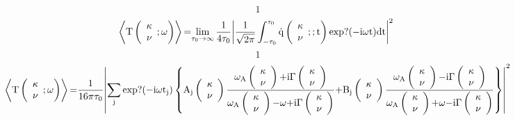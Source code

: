 \documentclass{article}
\begin{document}
\[1\] 
\[\left\langle {\rm T}\left( \begin{array}{c}
{\mathbf \kappa } \\ 
\nu  \end{array}
;\omega \right)\right\rangle {\rm =}{\mathop{\lim }_{{\tau }_0\to \infty } \frac{{\rm 1}}{{\rm 4}{\tau }_0}{\left|\frac{{\rm 1}}{\sqrt{{\rm 2}\pi }}\int^{{\tau }_0}_{{\rm -}{\tau }_0}{\dot{{\rm q}}\left( \begin{array}{c}
{\mathbf \kappa } \\ 
\nu  \end{array}
;;{\rm t}\right){\rm exp}?{\rm (-i}\omega {\rm t)dt}}\right|}^{{\rm 2}}\ }\] 
\[1\] 
\[\left\langle {\rm T}\left( \begin{array}{c}
{\mathbf \kappa } \\ 
\nu  \end{array}
;\omega \right)\right\rangle {\rm =}\frac{{\rm 1}}{{\rm 16}\pi {\tau }_0}{\left|\sum_{{\rm j}}{{\rm exp}?{\rm (-i}\omega {{\rm t}}_{{\rm j}}{\rm )}\left\{{{\rm A}}_{{\rm j}}\left( \begin{array}{c}
{\mathbf \kappa } \\ 
\nu  \end{array}
\right)\frac{{\omega }_{{\rm A}}\left( \begin{array}{c}
{\mathbf \kappa } \\ 
\nu  \end{array}
\right){\rm +i}\Gamma \left( \begin{array}{c}
{\mathbf \kappa } \\ 
\nu  \end{array}
\right)}{{\omega }_{{\rm A}}\left( \begin{array}{c}
{\mathbf \kappa } \\ 
\nu  \end{array}
\right){\rm -}\omega {\rm +i}\Gamma \left( \begin{array}{c}
{\mathbf \kappa } \\ 
\nu  \end{array}
\right)}{\rm +}{{\rm B}}_{{\rm j}}\left( \begin{array}{c}
{\mathbf \kappa } \\ 
\nu  \end{array}
\right)\frac{{\omega }_{{\rm A}}\left( \begin{array}{c}
{\mathbf \kappa } \\ 
\nu  \end{array}
\right){\rm -}{\rm i}\Gamma \left( \begin{array}{c}
{\mathbf \kappa } \\ 
\nu  \end{array}
\right)}{{\omega }_{{\rm A}}\left( \begin{array}{c}
{\mathbf \kappa } \\ 
\nu  \end{array}
\right){\rm +}\omega {\rm -i}\Gamma \left( \begin{array}{c}
{\mathbf \kappa } \\ 
\nu  \end{array}
\right)}\right\}}\right|}^{{\rm 2}}\] 
\end{document}
